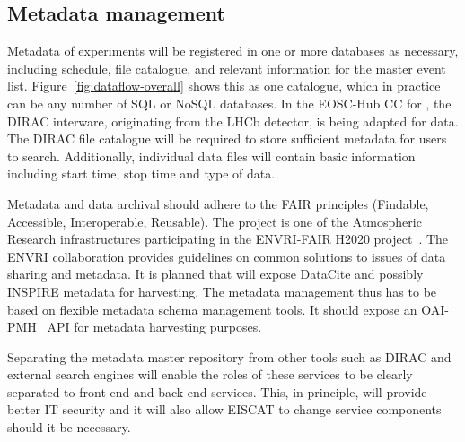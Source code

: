 \documentclass[12pt,a4paper]{article}
\begin{document}


\subsection{Metadata management}

Metadata of \ED experiments will be registered in one or more databases as necessary, including schedule, file catalogue, and relevant information for the master event list. Figure~\ref{fig:dataflow-overall} shows this as one catalogue, which in practice can be any number of SQL or NoSQL databases. In the EOSC-Hub CC for \ED, the DIRAC interware, originating from the LHCb detector, is being adapted for \ED data.  The DIRAC file catalogue will be required to store sufficient metadata for users to search. 
 Additionally, individual data files will contain basic information including start time, stop time and type of data. 

Metadata and data archival should adhere to the FAIR principles (Findable, Accessible, Interoperable, Reusable). 
The \ED project is one of the Atmospheric Research infrastructures participating in the ENVRI-FAIR H2020 project~\cite{envri-fair}. 
The ENVRI collaboration provides guidelines on common solutions to issues of data sharing and metadata. 
It is planned that \ED will expose DataCite and possibly INSPIRE metadata for harvesting. 
The metadata management thus has to be based on flexible metadata schema management tools. 
It should expose an OAI-PMH~\cite{oai-pmh} API for metadata harvesting purposes.

Separating the metadata master repository from other tools such as DIRAC and external search engines will enable the roles of these services to be clearly separated to front-end and back-end services.  
This, in principle, will provide better IT security and it will also allow EISCAT to change service components should it be necessary. 

\end{document}
